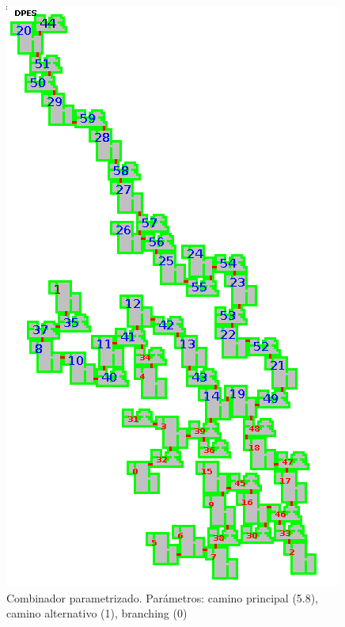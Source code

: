\begin{figure}[H]
\centering
\includegraphics[scale=0.75]{img/mapsamples/MAINalt}
\caption{Combinador parametrizado. Parámetros: camino principal (5.8), camino alternativo (1), branching (0)
\label{fig:grfmainalt}}
\end{figure}


